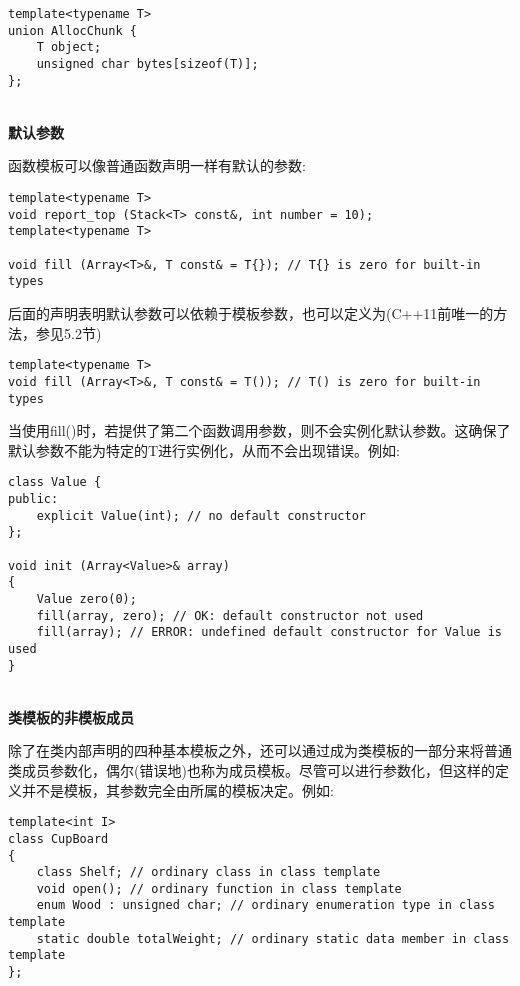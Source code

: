 \begin{lstlisting}[style=styleCXX]
template<typename T>
union AllocChunk {
	T object;
	unsigned char bytes[sizeof(T)];
};
\end{lstlisting}

\hspace*{\fill} \\ %
\noindent
\textbf{默认参数}

函数模板可以像普通函数声明一样有默认的参数:

\begin{lstlisting}[style=styleCXX]
template<typename T>
void report_top (Stack<T> const&, int number = 10);
template<typename T>

void fill (Array<T>&, T const& = T{}); // T{} is zero for built-in types
\end{lstlisting}

后面的声明表明默认参数可以依赖于模板参数，也可以定义为(C++11前唯一的方法，参见5.2节)

\begin{lstlisting}[style=styleCXX]
template<typename T>
void fill (Array<T>&, T const& = T()); // T() is zero for built-in types
\end{lstlisting}

当使用fill()时，若提供了第二个函数调用参数，则不会实例化默认参数。这确保了默认参数不能为特定的T进行实例化，从而不会出现错误。例如:

\begin{lstlisting}[style=styleCXX]
class Value {
public:
	explicit Value(int); // no default constructor
};

void init (Array<Value>& array)
{
	Value zero(0);
	fill(array, zero); // OK: default constructor not used
	fill(array); // ERROR: undefined default constructor for Value is used
}
\end{lstlisting}

\hspace*{\fill} \\ %
\noindent
\textbf{类模板的非模板成员}

除了在类内部声明的四种基本模板之外，还可以通过成为类模板的一部分来将普通类成员参数化，偶尔(错误地)也称为成员模板。尽管可以进行参数化，但这样的定义并不是模板，其参数完全由所属的模板决定。例如:

\begin{lstlisting}[style=styleCXX]
template<int I>
class CupBoard
{
	class Shelf; // ordinary class in class template
	void open(); // ordinary function in class template
	enum Wood : unsigned char; // ordinary enumeration type in class template
	static double totalWeight; // ordinary static data member in class template
};
\end{lstlisting}

